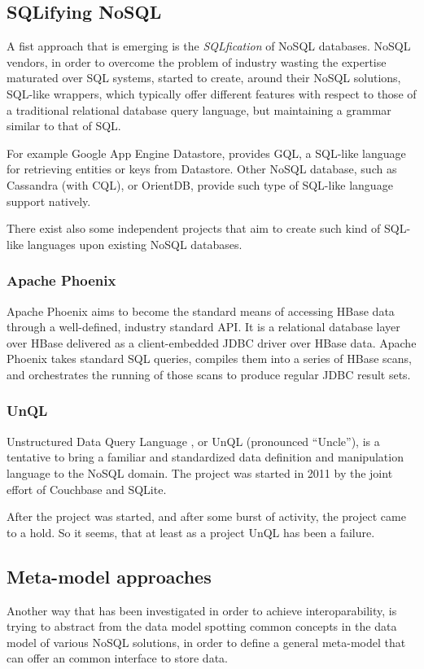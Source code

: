 \subsection{SQLifying NoSQL}
A fist approach that is emerging is the \textit{SQLfication} of NoSQL databases.
NoSQL vendors, in order to overcome the problem of industry wasting the expertise maturated over SQL systems, started to create, around their NoSQL solutions, SQL-like wrappers,  which typically offer different features with respect to those of a traditional relational database query language, but maintaining a grammar similar to that of SQL.

\noindent For example Google App Engine Datastore, provides GQL, a SQL-like language for retrieving entities or keys from Datastore.
Other NoSQL database, such as Cassandra (with CQL), or OrientDB, provide  such type of SQL-like language support natively.

\newparagraph There exist also some independent projects that aim to create such kind of SQL-like languages upon existing NoSQL databases.

\subsubsection{Apache Phoenix} 
Apache Phoenix \cite{online:apache-phoenix} aims to become the standard means of accessing HBase data through a well-defined, industry standard API.
It is a relational database layer over HBase delivered as a client-embedded JDBC driver over HBase data. Apache Phoenix takes standard SQL queries, compiles them into a series of HBase scans, and orchestrates the running of those scans to produce regular JDBC result sets. 

\subsubsection{UnQL}  
Unstructured Data Query Language \cite{online:unql}, or UnQL (pronounced “Uncle”), is a tentative to bring a familiar and standardized data definition and manipulation language to the NoSQL domain. The project was started in 2011 by the joint effort of Couchbase and SQLite.

\noindent After the project was started, and after some burst of activity, the project came to a hold. So it seems, that at least as a project UnQL has been a failure. 

\subsection{Meta-model approaches}
Another way that has been investigated in order to achieve interoparability,  is trying to abstract from the data model spotting common concepts in the data model of various NoSQL solutions, in order to define a general meta-model that can offer an common interface to store data.

